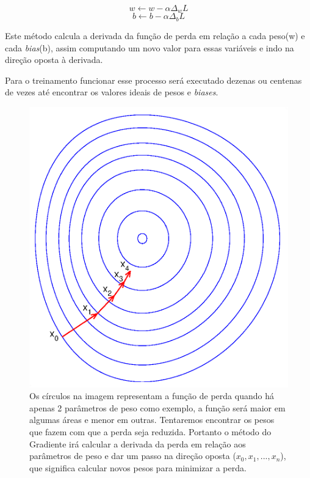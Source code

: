 \begin{equation}
  w \leftarrow w - \alpha \Delta_w L
\end{equation}
\begin{equation}
  b \leftarrow b - \alpha \Delta_b L
\end{equation}

Este método calcula a derivada da função de perda em relação a cada
peso(w) e cada \textit{bias}(b), assim computando um novo valor para
essas variáveis e indo na direção oposta à derivada.

Para o treinamento funcionar esse processo será executado dezenas ou
centenas de vezes até encontrar os valores ideais de pesos e
\textit{biases}.

\begin{figure}[H]
\centering
\includegraphics[scale=0.6]{imagens/Gradient_descent.eps}
\caption{Os círculos na imagem representam a função de perda quando há
  apenas 2 parâmetros de peso como exemplo, a função será maior em
  algumas áreas e menor em outras. Tentaremos encontrar os pesos que
  fazem com que a perda seja reduzida. Portanto o método do Gradiente
  irá calcular a derivada da perda em relação aos parâmetros de peso e
  dar um passo na direção oposta ($x_0,x_1,...,x_n$), que significa
  calcular novos pesos para minimizar a perda.}
\label{fig:gradient_descent}
\end{figure}

